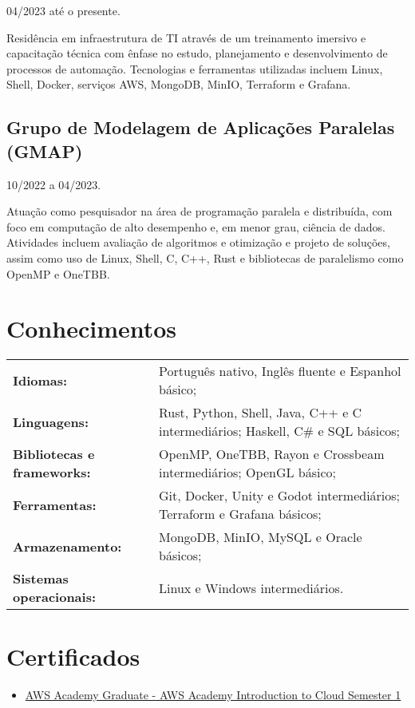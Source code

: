 \documentclass[11pt]{article}
\begin{document}
04/2023 até o presente.

Residência em infraestrutura de TI através de um treinamento imersivo e
capacitação técnica com ênfase no estudo, planejamento e desenvolvimento de
processos de automação. Tecnologias e ferramentas utilizadas incluem Linux,
Shell, Docker, serviços AWS, MongoDB, MinIO, Terraform e Grafana.

\subsection*{Grupo de Modelagem de Aplicações Paralelas (GMAP) \hfill {}}

10/2022 a 04/2023.

Atuação como pesquisador na área de programação paralela e distribuída, com
foco em computação de alto desempenho e, em menor grau, ciência de dados.
Atividades incluem avaliação de algoritmos e otimização e projeto de soluções,
assim como uso de Linux, Shell, C, C++, Rust e bibliotecas de paralelismo como
OpenMP e OneTBB.

\section*{Conhecimentos}

\begin{tabular}{ l l }
	\textbf{Idiomas:} & Português nativo, Inglês fluente e Espanhol básico; \\
	\textbf{Linguagens:} & Rust, Python, Shell, Java, C++ e C intermediários; Haskell, C\# e SQL básicos; \\
	\textbf{Bibliotecas e frameworks:} & OpenMP, OneTBB, Rayon e Crossbeam intermediários; OpenGL básico; \\
	\textbf{Ferramentas:} & Git, Docker, Unity e Godot intermediários; Terraform e Grafana básicos; \\
	\textbf{Armazenamento:} & MongoDB, MinIO, MySQL e Oracle básicos; \\
	\textbf{Sistemas operacionais:} & Linux e Windows intermediários. \\
\end{tabular}

\section*{Certificados}

\begin{itemize}
	\item \href{https://www.credly.com/badges/69bb404e-ae99-4a93-96b1-228fa98d0859/public_url}{AWS Academy Graduate - AWS Academy Introduction to Cloud Semester 1}
\end{itemize}
\end{document}

